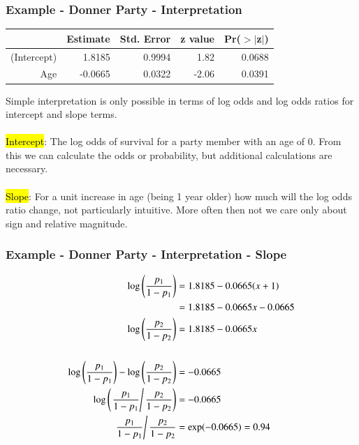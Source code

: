 
\begin{frame}
\frametitle{Example - Donner Party - Interpretation}

{\scriptsize
\begin{center}
\begin{tabular}{rrrrr}
  \hline
 & Estimate & Std. Error & z value & Pr($>$$|$z$|$) \\ 
  \hline
(Intercept) & 1.8185 & 0.9994 & 1.82 & 0.0688 \\ 
  Age & -0.0665 & 0.0322 & -2.06 & 0.0391 \\ 
   \hline
\end{tabular}
\end{center}
}

Simple interpretation is only possible in terms of log odds and log odds ratios for intercept and slope terms.\\

~\\

\hl{Intercept}: The log odds of survival for a party member with an age of 0. From this we can calculate the odds or probability, but additional calculations are necessary.\\

~\\

\hl{Slope}: For a unit increase in age (being 1 year older) how much will the log odds ratio change, not particularly intuitive. More often then not we  care only about sign and relative magnitude. 

\end{frame}


\begin{frame}[fragile]
\frametitle{Example - Donner Party - Interpretation - Slope}

{\scriptsize
\begin{align*}
\log\left(\frac{p_1}{1-p_1}\right) &= 1.8185-0.0665 (x+1) \\
                                   &= 1.8185-0.0665 x-0.0665 \\
\log\left(\frac{p_2}{1-p_2}\right) &= 1.8185-0.0665 x \\
\\
\log\left(\frac{p_1}{1-p_1}\right) - \log\left(\frac{p_2}{1-p_2}\right) &= -0.0665 \\
\log\left(\left. \frac{p_1}{1-p_1} \right/ \frac{p_2}{1-p_2} \right) &= -0.0665 \\
\left. \frac{p_1}{1-p_1} \right/ \frac{p_2}{1-p_2} &= \exp(-0.0665) = 0.94
\end{align*}
}

\end{frame}

